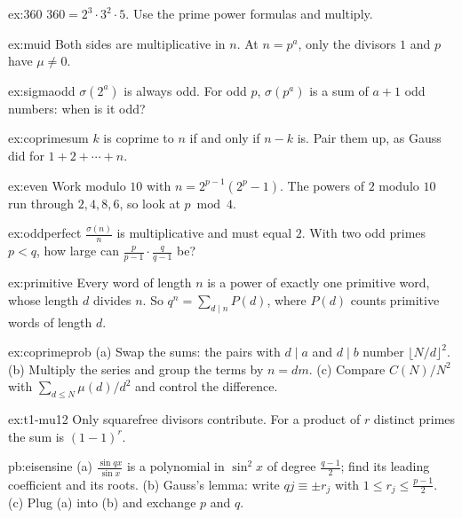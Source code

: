 \begin{hint}{ex:360}
$360=2^3\cdot3^2\cdot5$. Use the prime power formulas and multiply.
\end{hint}
\begin{hint}{ex:muid}
Both sides are multiplicative in $n$. At $n=p^a$, only the divisors $1$ and $p$ have $\mu\ne0$.
\end{hint}
\begin{hint}{ex:sigmaodd}
$\sigma(2^a)$ is always odd. For odd $p$, $\sigma(p^a)$ is a sum of $a+1$ odd numbers: when is it odd?
\end{hint}
\begin{hint}{ex:coprimesum}
$k$ is coprime to $n$ if and only if $n-k$ is. Pair them up, as Gauss did for $1+2+\cdots+n$.
\end{hint}
\begin{hint}{ex:even}
Work modulo $10$ with $n=2^{p-1}(2^p-1)$. The powers of $2$ modulo $10$ run through $2,4,8,6$, so look at $p\bmod4$.
\end{hint}
\begin{hint}{ex:oddperfect}
$\frac{\sigma(n)}n$ is multiplicative and must equal $2$. With two odd primes $p<q$, how large can $\frac p{p-1}\cdot\frac q{q-1}$ be?
\end{hint}
\begin{hint}{ex:primitive}
Every word of length $n$ is a power of exactly one primitive word, whose length $d$ divides $n$. So $q^n=\sum_{d\mid n}P(d)$, where $P(d)$ counts primitive words of length $d$.
\end{hint}
\begin{hint}{ex:coprimeprob}
(a) Swap the sums: the pairs with $d\mid a$ and $d\mid b$ number $\lfloor N/d\rfloor^2$. (b) Multiply the series and group the terms by $n=dm$. (c) Compare $C(N)/N^2$ with $\sum_{d\le N}\mu(d)/d^2$ and control the difference.
\end{hint}

\begin{hint}{ex:t1-mu12}
Only squarefree divisors contribute. For a product of $r$ distinct primes the sum is $(1-1)^r$.
\end{hint}

\begin{hint}{pb:eisensine}
(a) $\frac{\sin qx}{\sin x}$ is a polynomial in $\sin^2x$ of degree $\frac{q-1}2$; find its leading coefficient and its
roots. (b) Gauss's lemma: write $qj\equiv\pm r_j$ with $1\le r_j\le\frac{p-1}2$. (c) Plug (a) into (b) and exchange $p$
and $q$.
\end{hint}

